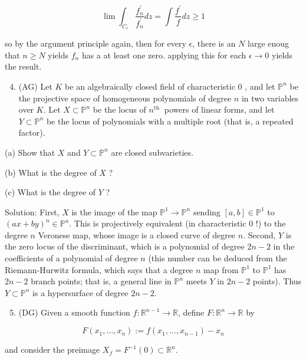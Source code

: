 \documentclass[10pt]{article}
\begin{document}
$$
\lim \int_{C_{\epsilon}} \frac{f_{n}^{\prime}}{f_{n}^{\prime}} d z=\int \frac{f^{\prime}}{f} d z \geq 1
$$

so by the argument principle again, then for every $\epsilon$, there is an $N$ large enoug that $n \geq N$ yields $f_{n}$ has a at least one zero. applying this for each $\epsilon \rightarrow 0$ yields the result.

\begin{enumerate}
  \setcounter{enumi}{3}
  \item (AG) Let $K$ be an algebraically closed field of characteristic 0 , and let $\mathbb{P}^{n}$ be the projective space of homogeneous polynomials of degree $n$ in two variables over $K$. Let $X \subset \mathbb{P}^{n}$ be the locus of $n^{\text {th }}$ powers of linear forms, and let $Y \subset \mathbb{P}^{n}$ be the locus of polynomials with a multiple root (that is, a repeated factor).
\end{enumerate}

(a) Show that $X$ and $Y \subset \mathbb{P}^{n}$ are closed subvarieties.

(b) What is the degree of $X$ ?

(c) What is the degree of $Y$ ?

Solution: First, $X$ is the image of the map $\mathbb{P}^{1} \rightarrow \mathbb{P}^{n}$ sending $[a, b] \in \mathbb{P}^{1}$ to $(a x+b y)^{n} \in \mathbb{P}^{n}$. This is projectively equivalent (in characteristic 0 !) to the degree $n$ Veronese map, whose image is a closed curve of degree $n$. Second, $Y$ is the zero locus of the discriminant, which is a polynomial of degree $2 n-2$ in the coefficients of a polynomial of degree $n$ (this number can be deduced from the Riemann-Hurwitz formula, which says that a degree $n$ map from $\mathbb{P}^{1}$ to $\mathbb{P}^{1}$ has $2 n-2$ branch points; that is, a general line in $\mathbb{P}^{n}$ meets $Y$ in $2 n-2$ points). Thus $Y \subset \mathbb{P}^{n}$ is a hypersurface of degree $2 n-2$.

\begin{enumerate}
  \setcounter{enumi}{4}
  \item (DG) Given a smooth function $f: \mathbb{R}^{n-1} \rightarrow \mathbb{R}$, define $F: \mathbb{R}^{n} \rightarrow \mathbb{R}$ by
\end{enumerate}

$$
F\left(x_{1}, \ldots, x_{n}\right):=f\left(x_{1}, \ldots, x_{n-1}\right)-x_{n}
$$

and consider the preimage $X_{f}=F^{-1}(0) \subset \mathbb{R}^{n}$.
\end{document}

